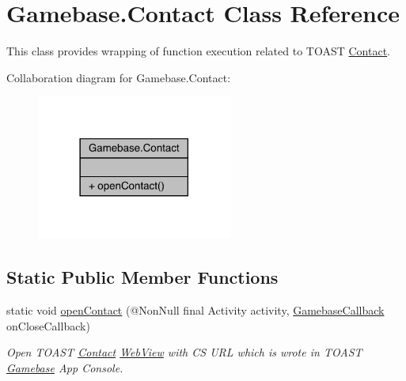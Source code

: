 \hypertarget{classcom_1_1toast_1_1android_1_1gamebase_1_1_gamebase_1_1_contact}{}\section{Gamebase.\+Contact Class Reference}
\label{classcom_1_1toast_1_1android_1_1gamebase_1_1_gamebase_1_1_contact}


This class provides wrapping of function execution related to T\+O\+A\+ST \hyperlink{classcom_1_1toast_1_1android_1_1gamebase_1_1_gamebase_1_1_contact}{Contact}.  




Collaboration diagram for Gamebase.\+Contact\+:
\nopagebreak
\begin{figure}[H]
\begin{center}
\leavevmode
\includegraphics[width=182pt]{classcom_1_1toast_1_1android_1_1gamebase_1_1_gamebase_1_1_contact__coll__graph}
\end{center}
\end{figure}
\subsection*{Static Public Member Functions}
\begin{DoxyCompactItemize}
\item 
static void \hyperlink{classcom_1_1toast_1_1android_1_1gamebase_1_1_gamebase_1_1_contact_a748d63949a52c48845b042e2de9882ac}{open\+Contact} (@Non\+Null final Activity activity, \hyperlink{interfacecom_1_1toast_1_1android_1_1gamebase_1_1_gamebase_callback}{Gamebase\+Callback} on\+Close\+Callback)
\begin{DoxyCompactList}\small\item\em Open T\+O\+A\+ST \hyperlink{classcom_1_1toast_1_1android_1_1gamebase_1_1_gamebase_1_1_contact}{Contact} \hyperlink{classcom_1_1toast_1_1android_1_1gamebase_1_1_gamebase_1_1_web_view}{Web\+View} with CS U\+RL which is wrote in T\+O\+A\+ST \hyperlink{classcom_1_1toast_1_1android_1_1gamebase_1_1_gamebase}{Gamebase} App Console. \end{DoxyCompactList}\end{DoxyCompactItemize}


